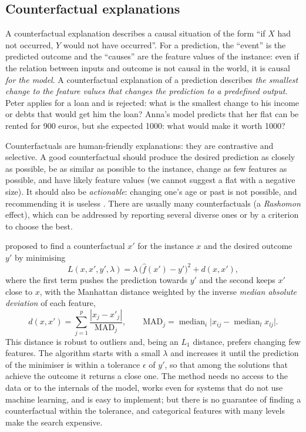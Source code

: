 \subsection{Counterfactual explanations}

A counterfactual explanation describes a causal situation of the form ``if $X$ had not occurred, $Y$
would not have occurred''. For a prediction, the ``event'' is the predicted outcome and the ``causes''
are the feature values of the instance: even if the relation between inputs and outcome is not causal
in the world, it is causal \emph{for the model}. A counterfactual explanation of a prediction
describes \emph{the smallest change to the feature values that changes the prediction to a
predefined output}. Peter applies for a loan and is rejected: what is the smallest change to his
income or debts that would get him the loan? Anna's model predicts that her flat can be rented for
900 euros, but she expected 1000: what would make it worth 1000?

Counterfactuals are human-friendly explanations: they are contrastive and selective. A good
counterfactual should produce the desired prediction as closely as possible, be as similar as possible
to the instance, change as few features as possible, and have likely feature values (we cannot suggest
a flat with a negative size). It should also be \emph{actionable}: changing one's age or past is not
possible, and recommending it is useless \citep{ustun2019actionable}. There are usually many
counterfactuals (a \emph{Rashomon} effect), which can be addressed by reporting several diverse ones
\citep{mothilal2020explaining} or by a criterion to choose the best.

\citet{wachter2018counterfactual} proposed to find a counterfactual $x'$ for the instance $x$ and the
desired outcome $y'$ by minimising
\begin{equation}
  L(x,x',y',\lambda)=\lambda\,\bigl(\hat f(x')-y'\bigr)^2+d(x,x'),
\end{equation}
where the first term pushes the prediction towards $y'$ and the second keeps $x'$ close to $x$, with the
Manhattan distance weighted by the inverse \emph{median absolute deviation} of each feature,
\begin{equation}
  d(x,x')=\sum_{j=1}^{p}\frac{|x_j-x'_j|}{\mathrm{MAD}_j},\qquad
  \mathrm{MAD}_j=\operatorname{median}_{i}\bigl|x_{ij}-\operatorname{median}_l x_{lj}\bigr| .
\end{equation}
This distance is robust to outliers and, being an $L_1$ distance, prefers changing few features. The
algorithm starts with a small $\lambda$ and increases it until the prediction of the minimiser is
within a tolerance $\epsilon$ of $y'$, so that among the solutions that achieve the outcome it returns a
close one. The method needs no access to the data or to the internals of the model, works even for
systems that do not use machine learning, and is easy to implement; but there is no guarantee of
finding a counterfactual within the tolerance, and categorical features with many levels make the search
expensive.

